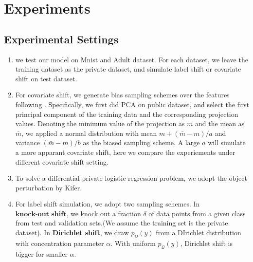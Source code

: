 \documentclass{article}
\def\cQ{\mathcal{Q}}
\theoremstyle{definition}
\begin{document}
\section{Experiments}
\subsection{Experimental Settings}
\begin{enumerate}
	\item we test our model on Mnist and Adult dataset. For each dataset, we leave the training dataset as the private dataset, and simulate label shift or covariate shift on test dataset.
	\item  For covariate shift, we generate bias sampling schemes over the features following \cite{gre_cov}. Specifically,  we first did PCA on public dataset, and select the first principal component of the training data and the corresponding projection values. Denoting the minimum value of the projection as $m$ and the mean as $\bar{m}$, we applied a normal distribution with mean $m + (\bar{m}-m)/a$ and variance $(\bar{m}-m)/b$ as the biased sampling scheme. A large $a$ will simulate a more apparant covariate shift, here we compare the experiements under different covariate shift setting.
	\item To solve a differential private logistic regression problem, we adopt the object perturbation by Kifer. 
	\item For label shift simulation, we adopt two sampling schemes. In $\textbf{knock-out shift}$, we knock out a fraction $\delta$ of data points from a given class from test and validation sets.(We assume the training set is the private dataset). In \textbf{Dirichlet shift}, we draw $p_\cQ(y)$ from a DIrichlet distribution with concentration parameter $\alpha$. With uniform $p_{\cQ}(y)$, Dirichlet shift is bigger for smaller $\alpha$.
\end{enumerate}
\end{document}
